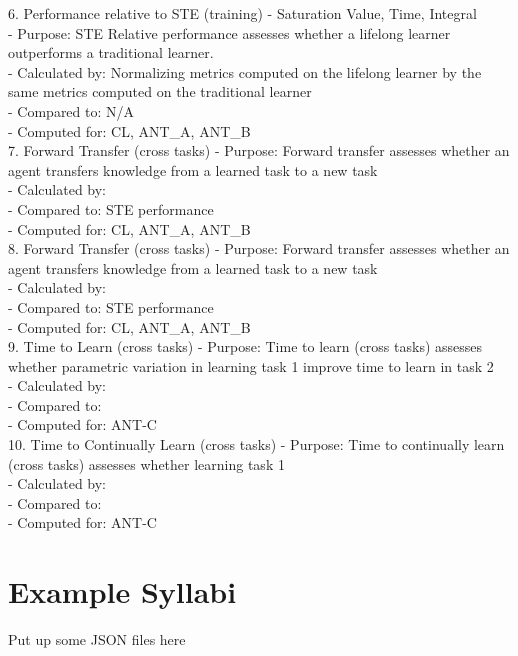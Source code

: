 6. Performance relative to STE (training) - Saturation Value, Time, Integral\\
    - Purpose: STE Relative performance assesses whether a lifelong learner outperforms a traditional learner.\\
    - Calculated by: Normalizing metrics computed on the lifelong learner by the same metrics computed on the traditional learner\\
    - Compared to: N/A\\
    - Computed for: CL, ANT\_A, ANT\_B\\

7. Forward Transfer (cross tasks)
    - Purpose: Forward transfer assesses whether an agent transfers knowledge from a learned task to a new task\\ 
    - Calculated by:\\ 
    - Compared to: STE performance\\
    - Computed for: CL, ANT\_A, ANT\_B\\
    
8. Forward Transfer (cross tasks)
    - Purpose: Forward transfer assesses whether an agent transfers knowledge from a learned task to a new task\\
    - Calculated by:\\
    - Compared to: STE performance\\
    - Computed for: CL, ANT\_A, ANT\_B\\

9. Time to Learn (cross tasks)
    - Purpose: Time to learn (cross tasks) assesses whether parametric variation in learning task 1 improve time to learn in task 2\\
    - Calculated by: \\
    - Compared to:\\
    - Computed for: ANT-C\\
    
10. Time to Continually Learn (cross tasks)
    - Purpose: Time to continually learn (cross tasks) assesses whether learning task 1 \\
    - Calculated by: \\
    - Compared to:\\
    - Computed for: ANT-C\\


\section{Example Syllabi}

Put up some JSON files here
